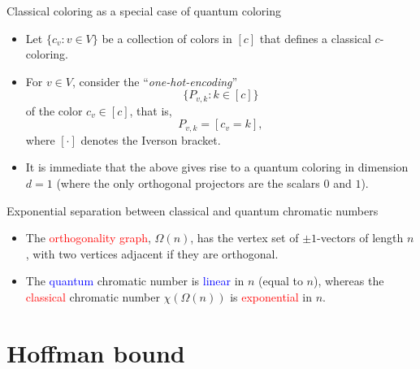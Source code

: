 \documentclass{beamer}
\renewcommand{\>}{\rangle}
\newcommand{\<}{\langle}
\begin{document}
%

\begin{frame}{Classical coloring as a special case of quantum coloring}

\begin{itemize}
\item Let $\{c_v : v\in V\}$ be a collection of colors in $[c]$ that defines a classical $c$-coloring.  

\item For $v\in V$, consider the ``\emph{one-hot-encoding}''
\[
\{P_{v,k} : k \in [c]\}
\] 
of the color $c_v\in [c]$, that is,
\[
P_{v,k} = [c_ v = k],
\]
where $[\cdot ]$ denotes the Iverson bracket.

\item It is immediate that the above gives rise to a quantum coloring in dimension $d=1$ (where the only orthogonal projectors are the scalars $0$ and $1$).
\end{itemize}

\end{frame}

%

\begin{frame}{Exponential separation between classical and quantum chromatic numbers}
\begin{itemize}
\item The \textcolor{red}{orthogonality graph}, $\Omega(n)$, has the vertex set of $\pm 1$-vectors of length $n$, with two vertices adjacent if they are orthogonal.

\item The \textcolor{blue}{quantum} chromatic number is \textcolor{blue}{linear} in $n$ (equal to $n$), whereas the \textcolor{red}{classical} chromatic number $\chi(\Omega(n))$ is \textcolor{red}{exponential} in $n$.
\end{itemize}
\end{frame}

%

\section{Hoffman bound}
\end{document}
